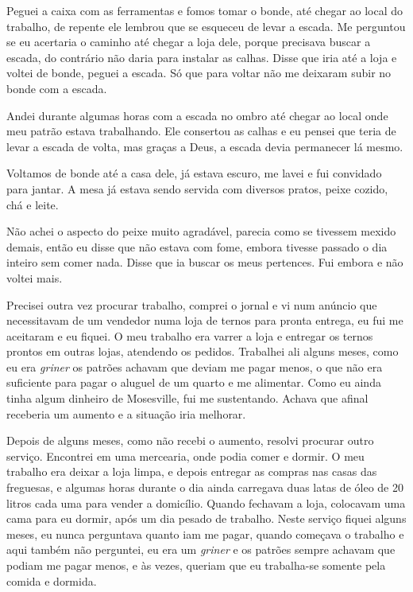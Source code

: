 Peguei a caixa com as ferramentas e fomos tomar o bonde, até chegar ao
local do trabalho, de repente ele lembrou que se esqueceu de levar a
escada. Me perguntou se eu acertaria o caminho até chegar a loja dele,
porque precisava buscar a escada, do contrário não daria para instalar
as calhas. Disse que iria até a loja e voltei de bonde, peguei a escada.
Só que para voltar não me deixaram subir no bonde com a escada.

Andei durante algumas horas com a escada no ombro até chegar ao local
onde meu patrão estava trabalhando. Ele consertou as calhas e eu pensei
que teria de levar a escada de volta, mas graças a Deus, a escada devia
permanecer lá mesmo.

Voltamos de bonde até a casa dele, já estava escuro, me lavei e fui
convidado para jantar. A mesa já estava sendo servida com diversos
pratos, peixe cozido, chá e leite.

Não achei o aspecto do peixe muito agradável, parecia como se tivessem
mexido demais, então eu disse que não estava com fome, embora tivesse
passado o dia inteiro sem comer nada. Disse que ia buscar os meus
pertences. Fui embora e não voltei mais.

Precisei outra vez procurar trabalho, comprei o jornal e vi num anúncio
que necessitavam de um vendedor numa loja de ternos para pronta entrega,
eu fui me aceitaram e eu fiquei. O meu trabalho era varrer a loja e
entregar os ternos prontos em outras lojas, atendendo os pedidos.
Trabalhei ali alguns meses, como eu era \textit{griner} os patrões achavam
que deviam me pagar menos, o que não era suficiente para pagar o aluguel
de um quarto e me alimentar. Como eu ainda tinha algum dinheiro de
Mosesville, fui me sustentando. Achava que afinal receberia um aumento e
a situação iria melhorar.

Depois de alguns meses, como não recebi o aumento, resolvi procurar
outro serviço. Encontrei em uma mercearia, onde podia comer e dormir. O
meu trabalho era deixar a loja limpa, e depois entregar as compras nas
casas das freguesas, e algumas horas durante o dia ainda carregava duas
latas de óleo de 20 litros cada uma para vender a domicílio. Quando
fechavam a loja, colocavam uma cama para eu dormir, após um dia pesado
de trabalho. Neste serviço fiquei alguns meses, eu nunca perguntava
quanto iam me pagar, quando começava o trabalho e aqui também não
perguntei, eu era um \textit{griner} e os patrões sempre achavam que
podiam me pagar menos, e às vezes, queriam que eu trabalha-se somente
pela comida e dormida.

